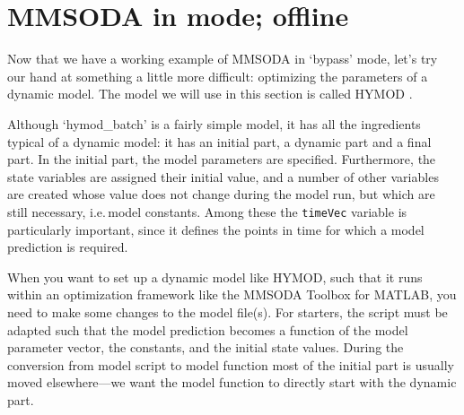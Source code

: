 \section{MMSODA in  mode; offline}

Now that we have a working example of MMSODA in `bypass' mode, let's try our hand at something a little more difficult: optimizing the parameters of a dynamic model. The model we will use in this section is called HYMOD \citep[e.g.][]{boyle}.


Although `hymod\_batch' is a fairly simple model, it has all the ingredients typical of a dynamic model: it has an initial part, a dynamic part and a final part. In the initial part, the model parameters are specified. Furthermore, the state variables are assigned their initial value, and a number of other variables are created whose value does not change during the model run, but which are still necessary, i.e.\,model constants. Among these the \texttt{timeVec} variable is particularly important, since it defines the points in time for which a model prediction is required.

When you want to set up a dynamic model like HYMOD, such that it runs within an optimization framework like the MMSODA Toolbox for MATLAB, you need to make some changes to the model file(s). For starters, the script must be adapted such that the model prediction becomes a function of the model parameter vector, the constants, and the initial state values. During the conversion from model script to model function most of the initial part is usually moved elsewhere---we want the model function to directly start with the dynamic part.





